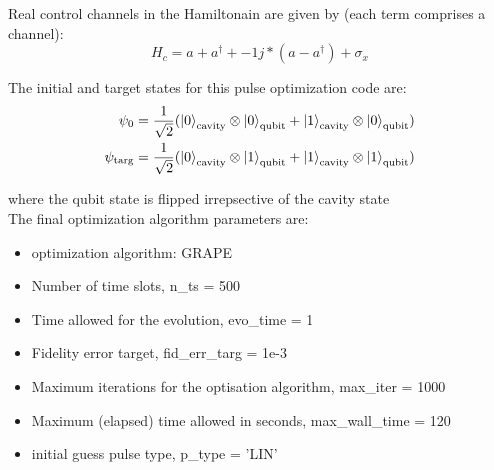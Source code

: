 \documentclass[12pt]{article}
\begin{document}
Real control channels in the Hamiltonain are given by (each term comprises a channel): 
\begin{equation}
    H_c = a + a^{\dagger} + -1j*(a - a^{\dagger}) + \sigma_x    
\end{equation}

The initial and target states for this pulse optimization code are: 
\begin{align*}
    \psi_0 &= \frac{1}{\sqrt{2}} (\ket{0}_{\text{cavity}} \otimes \ket{0}_{\text{qubit}} 
                + \ket{1}_{\text{cavity}} \otimes \ket{0}_{\text{qubit}})\\
    \psi_{\text{targ}} &= \frac{1}{\sqrt{2}} (\ket{0}_{\text{cavity}} \otimes \ket{1}_{\text{qubit}} 
                + \ket{1}_{\text{cavity}} \otimes \ket{1}_{\text{qubit}})\\
\end{align*}

where the qubit state is flipped irrepsective of the cavity state
\\
The final optimization algorithm parameters are:
\\ 
\begin{itemize}
    \item optimization algorithm: GRAPE
    \item Number of time slots, n\_ts = 500
    \item Time allowed for the evolution, evo\_time = 1
    \item Fidelity error target, fid\_err\_targ = 1e-3
    \item Maximum iterations for the optisation algorithm, max\_iter = 1000
    \item Maximum (elapsed) time allowed in seconds, max\_wall\_time = 120
    \item initial guess pulse type, p\_type = 'LIN'
\end{itemize}
\end{document}
